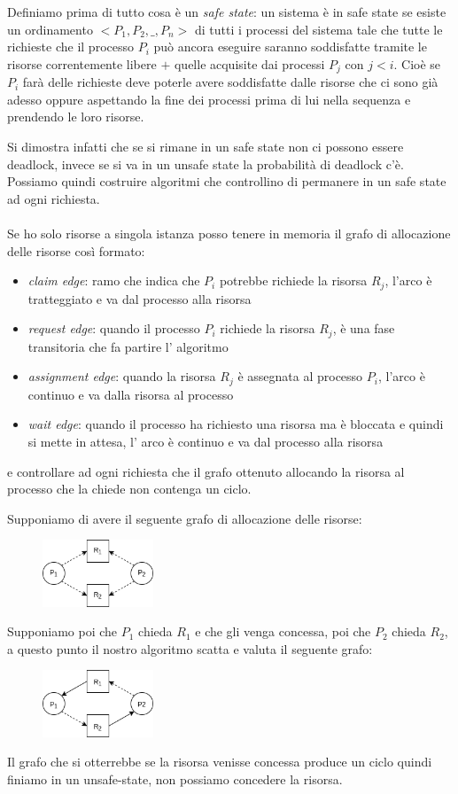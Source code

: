 Definiamo prima di tutto cosa è un \emph{safe state}: un sistema è in safe state se esiste un ordinamento $<P_1, P_2, \_, P_n>$ di tutti i processi del sistema tale che tutte le richieste che il processo $P_i$ può ancora eseguire saranno soddisfatte tramite le risorse correntemente libere $+$ quelle acquisite dai processi $P_j$ con $j < i$.
Cioè se $P_i$ farà delle richieste deve poterle avere soddisfatte dalle risorse che ci sono già adesso oppure aspettando la fine dei processi prima di lui nella sequenza e prendendo le loro risorse.

Si dimostra infatti che se si rimane in un safe state non ci possono essere deadlock, invece se si va in un unsafe state la probabilità di deadlock c'è.
Possiamo quindi costruire algoritmi che controllino di permanere in un safe state ad ogni richiesta.
\\
\\
Se ho solo risorse a singola istanza posso tenere in memoria il grafo di allocazione delle risorse così formato:
\begin{itemize}
    \item \emph{claim edge}: ramo che indica che $P_i$ potrebbe richiede la risorsa $R_j$, l'arco è tratteggiato e va dal processo alla risorsa
    \item \emph{request edge}: quando il processo $P_i$ richiede la risorsa $R_j$, è una fase transitoria che fa partire l' algoritmo
    \item \emph{assignment edge}: quando la risorsa $R_j$ è assegnata al processo $P_i$, l'arco è continuo e va dalla risorsa al processo
    \item \emph{wait edge}: quando il processo ha richiesto una risorsa ma è bloccata e quindi si mette in attesa, l' arco è continuo e va dal processo alla risorsa 
\end{itemize}
e controllare ad ogni richiesta che il grafo ottenuto allocando la risorsa al processo che la chiede non contenga un ciclo.

Supponiamo di avere il seguente grafo di allocazione delle risorse:
\begin{figure}[H]
    \centering
    \includegraphics[width=125px]{images/8_Deadlock/first_state.png}
\end{figure}
Supponiamo poi che $P_1$ chieda $R_1$ e che gli venga concessa, poi che $P_2$ chieda $R_2$, a questo punto il nostro algoritmo scatta e valuta il seguente grafo:
\begin{figure}[H]
    \centering
    \includegraphics[width=125px]{images/8_Deadlock/second_state.png}
\end{figure}
Il grafo che si otterrebbe se la risorsa venisse concessa produce un ciclo quindi finiamo in un unsafe-state, non possiamo concedere la risorsa.


